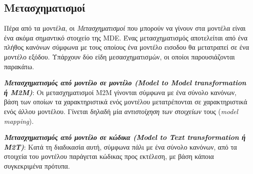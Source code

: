 \subsection{Μετασχηματισμοί}
\label{subsec:transforms}

Πέρα από τα μοντέλα, οι \textit{Μετασχηματισμοί} που μπορούν να γίνουν στα μοντέλα είναι ένα ακόμα σημαντικό στοιχείο της MDE. Ένας μετασχηματισμός αποτελείται από ένα πλήθος κανόνων σύμφωνα με τους οποίους ένα μοντέλο εισοδου θα μετατραπεί σε ένα μοντέλο εξόδου. Υπάρχουν δύο είδη μεσασχηματισμών, οι οποίοι παρουσιάζονται παρακάτω.

\textit{\textbf{Μετασχηματισμός από μοντέλο σε μοντέλο (Model to Model transformation ή M2M)}}: Οι μετασχηματισμοί M2M γίνονται σύμφωνα με ένα σύνολο κανόνων, βάση των οποίων τα χαρακτηριστικά ενός μοντέλου μετατρέπονται σε χαρακτηριστικά ενός άλλου μοντέλου. Γίνεται δηλαδή μία \textit{αντιστοίχηση των στοιχείων} τους (\textit{model mapping}).

\textit{\textbf{Μετασχηματισμός από μοντέλο σε κώδικα (Model to Text transformation ή M2T)}}: Κατά τη διαδικασία αυτή, σύμφωνα πάλι με ένα σύνολο κανόνων, από τα στοιχεία του μοντέλου παράγεται κώδικας προς εκτέλεση, με βάση κάποια συγκεκριμένα πρότυπα.